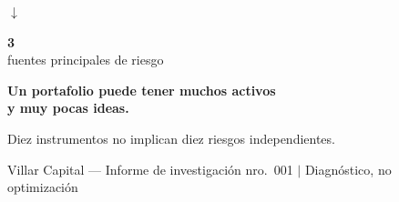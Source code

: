 \documentclass[11pt,letterpaper]{article}
\begin{document}
\vspace{0.15em}
\begin{center}{\large\color{Muted}$\downarrow$}\end{center}
\vspace{0.15em}

\begin{center}
{\fontsize{28}{32}\selectfont\bfseries\color{Ink} 3}\\[0.05em]
{\sffamily\small\color{Muted} fuentes principales de riesgo}
\end{center}

\vspace{0.7em}
\noindent{\color{Navy}\rule{\textwidth}{2.5pt}}
\vspace{0.55em}

\begin{center}
{\LARGE\bfseries\color{Ink}
Un portafolio puede tener muchos activos\\[0.3em]
y muy pocas ideas.}
\end{center}

\vspace{0.45em}
\begin{center}
{\large\color{Slate}
Diez instrumentos no implican diez riesgos independientes.}
\end{center}

\vspace{0.55em}
\noindent{\color{Navy}\rule{\textwidth}{2.5pt}}

\vspace{0.5em}
{\sffamily\small\color{Muted}
Villar Capital --- Informe de investigación nro.\ 001 $|$ Diagnóstico, no optimización}
\end{document}
